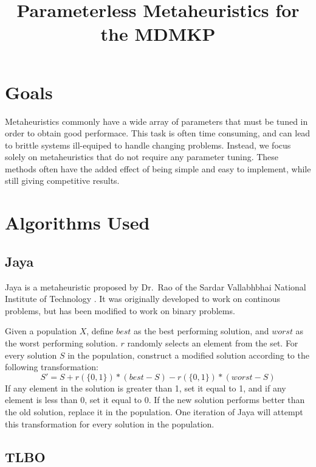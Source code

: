 \documentclass[11pt, letterpaper, onecolumn]{article}
\title{\textbf{Parameterless Metaheuristics for the MDMKP}}
\begin{document}
\maketitle

\section{Goals}

Metaheuristics commonly have a wide array of parameters that must be tuned in order to
obtain good performace. This task is often time consuming, and can lead to brittle systems
ill-equiped to handle changing problems. Instead, we focus solely on metaheuristics that
do not require any parameter tuning. These methods often have the added effect of being
simple and easy to implement, while still giving competitive results.

\section{Algorithms Used}

\subsection{Jaya}

Jaya is a metaheuristic proposed by Dr.~Rao of the Sardar Vallabhbhai National
Institute of Technology%
. It was originally developed to work on continous
problems, but has been modified to work on binary problems.

Given a population $X$, define $best$ as the best performing solution, and $worst$ as the worst performing solution. $r$ randomly selects an element from the set. For every solution $S$ in the population, construct a modified solution according to the following transformation:
\begin{equation} S' = S + r(\{0, 1\})*(best - S) - r(\{0, 1\})*(worst - S) \end{equation}
If any element in the solution is greater than 1, set it equal to 1, and if any element is less than 0, set it equal to 0. If the new solution performs better than the old solution, replace it in the population. One iteration of Jaya will attempt this transformation for every solution in the population. 

\subsection{TLBO }
\end{document}
